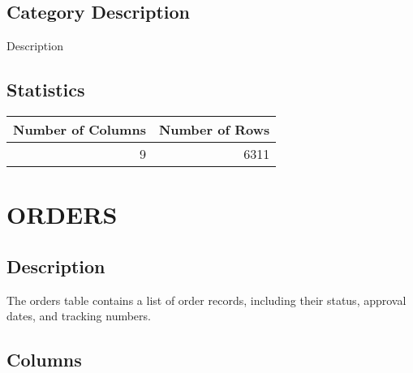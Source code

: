 \documentclass[
  letterpaper,
  DIV=11,
  numbers=noendperiod]{scrreprt}
\begin{document}
\hypertarget{category-description-23}{%
\section*{Category Description}\label{category-description-23}}

Description

\hypertarget{statistics-23}{%
\section*{Statistics}\label{statistics-23}}

\begin{longtable}{rr}
\toprule
Number of Columns & Number of Rows \\ 
\midrule
9 & 6311 \\ 
\bottomrule
\end{longtable}

\hypertarget{orders}{%
\chapter*{ORDERS}\label{orders}}

\hypertarget{description-24}{%
\section*{Description}\label{description-24}}

The orders table contains a list of order records, including their
status, approval dates, and tracking numbers.

\hypertarget{columns-24}{%
\section*{Columns}\label{columns-24}}
\end{document}
